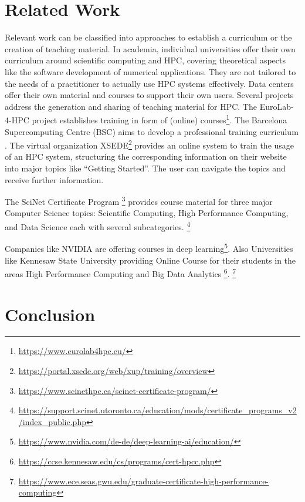 \documentclass[jocse]{jocseart}
\newcommand{\jk}[1]{\todo[inline]{JK: #1}}
\begin{document}
\section{Related Work}

\label{sec:related}

\jk{Please everyone!}

Relevant work can be classified into approaches to establish a curriculum or the creation of teaching material.
In academia, individual universities offer their own curriculum around scientific computing and HPC, covering theoretical aspects like the software development of numerical applications.
They are not tailored to the needs of a practitioner to actually use HPC systems effectively.
Data centers offer their own material and courses to support their own users.
Several projects address the generation and sharing of teaching material for HPC.
The EuroLab-4-HPC project establishes training in form of (online) courses\footnote{\url{https://www.eurolab4hpc.eu/}}.
The Barcelona Supercomputing Centre (BSC) aims to develop a professional training curriculum \cite{sancho2016bsc}.
The virtual organization XSEDE\footnote{\url{https://portal.xsede.org/web/xup/training/overview}} provides an online system to train the usage of an HPC system, structuring the corresponding information on their website into major topics like “Getting Started”.
The user can navigate the topics and receive further information.

The SciNet Certificate Program
\footnote{\url{https://www.scinethpc.ca/scinet-certificate-program/}}
 provides course material for three major Computer Science topics: Scientific Computing, High Performance Computing, and Data Science each with several subcategories.
\footnote{\url{https://support.scinet.utoronto.ca/education/mods/certificate_programs_v2/index_public.php}}

Companies like NVIDIA are offering courses in deep learning\footnote{\url{https://www.nvidia.com/de-de/deep-learning-ai/education/}}.
Also Universities like Kennesaw State University providing Online Course for their students in the areas High Performance Computing and Big Data Analytics
\footnote{\url{https://ccse.kennesaw.edu/cs/programs/cert-hpcc.php}}.
\footnote{\url{https://www.ece.seas.gwu.edu/graduate-certificate-high-performance-computing}}


\section{Conclusion}
\label{sec:conclusion}
\end{document}
